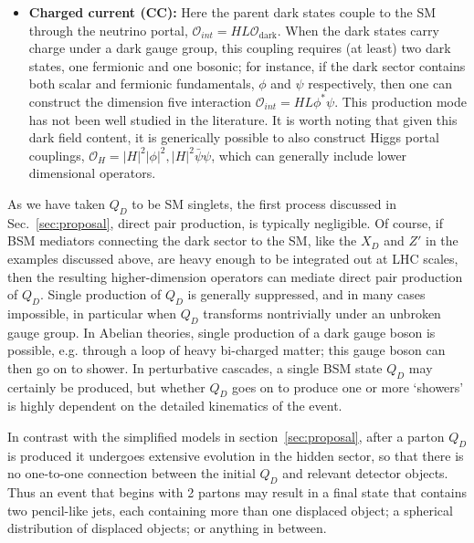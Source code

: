 \begin{itemize}
\item {\bf Charged current (CC):} Here the parent dark states couple to the SM through the neutrino portal, $\mathcal{O}_{int}=HL \mathcal{O}_{\mathrm{dark}}$.  When the dark states carry charge under a dark gauge group, this coupling requires (at least) two dark states, one fermionic and one bosonic; for instance, if the dark sector contains both scalar and fermionic fundamentals, $\phi$ and $\psi$ respectively, then one can construct the dimension five interaction $\mathcal{O}_{int} = HL\phi^* \psi$.  This production mode has not been well studied in the literature.  It is worth noting that given this dark field content, it is generically possible to also construct Higgs portal couplings, $\mathcal{O}_H = |H| ^ 2 |\phi|^2, |H|^2\bar\psi\psi$, which can generally include lower dimensional operators.

\end{itemize}
As we have taken $Q_D$ to be SM singlets, the first process discussed in Sec.~\ref{sec:proposal}, direct pair production, is
typically negligible.  Of course, if BSM mediators connecting the dark sector to the SM, 
like the $X_D$ and $Z'$ in the examples discussed above, are heavy enough to be integrated out at LHC scales, then the resulting higher-dimension operators can mediate direct pair production of $Q_D$.
Single production of $Q_D$ is generally suppressed, and in many cases impossible, in particular when $Q_D$ transforms nontrivially under an unbroken gauge group. In Abelian theories, single production of a dark gauge boson is possible, e.g. through a loop of heavy bi-charged matter; this gauge boson can then go on to shower.  In perturbative cascades, a single BSM state $Q_D$ may certainly be produced, but whether $Q_D$ goes on to produce one or more `showers' is highly dependent on the detailed kinematics of the event. 

In contrast with the simplified models in section~\ref{sec:proposal}, after a parton
$Q_D$ is produced it undergoes extensive evolution in the hidden sector, so that
there is no one-to-one connection between the initial $Q_D$ and
relevant detector objects.  Thus an event that begins with 2 partons may result in a final state that contains two pencil-like jets, each containing more than one displaced object; a spherical distribution of displaced objects; or anything in between.  


